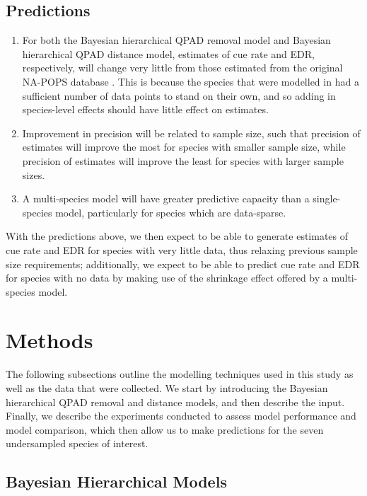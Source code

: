 \documentclass[12pt]{article}
\begin{document}
\subsection{Predictions}
\begin{enumerate}
	\item\label{pred1} For both the Bayesian hierarchical QPAD removal model and Bayesian hierarchical QPAD distance model, estimates of cue rate and EDR, respectively, will change very little from those estimated from the original NA-POPS database \cite{edwards_point_2023}. 
	This is because the species that were modelled in \citet{edwards_point_2023} had a sufficient number of data points to stand on their own, and so adding in species-level effects should have little effect on estimates. 
	\item\label{pred2} Improvement in precision will be related to sample size, such that precision of estimates will improve the most for species with smaller sample size, while precision of estimates will improve the least for species with larger sample sizes.
	\item\label{pred3} A multi-species model will have greater predictive capacity than a single-species model, particularly for species which are data-sparse.
\end{enumerate}

\par With the predictions above, we then expect to be able to generate estimates of cue rate and EDR for species with very little data, thus relaxing previous sample size requirements; additionally, we expect to be able to predict cue rate and EDR for species with no data by making use of the shrinkage effect offered by a multi-species model.

\section{Methods}

\par The following subsections outline the modelling techniques used in this study as well as the data that were collected. 
We start by introducing the Bayesian hierarchical QPAD removal and distance models, and then describe the input.
Finally, we describe the experiments conducted to assess model performance and model comparison, which then allow us to make predictions for the seven undersampled species of interest.

\subsection{Bayesian Hierarchical Models}
\end{document}

